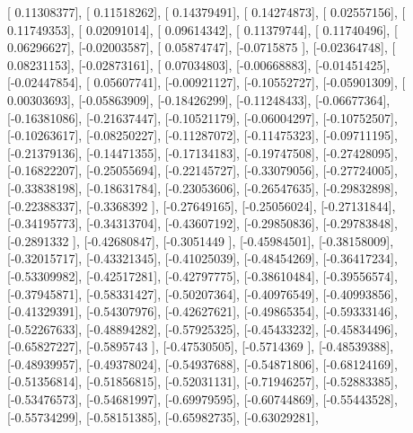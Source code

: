 \documentclass{article}
\begin{document}
       [ 0.11308377],
       [ 0.11518262],
       [ 0.14379491],
       [ 0.14274873],
       [ 0.02557156],
       [ 0.11749353],
       [ 0.02091014],
       [ 0.09614342],
       [ 0.11379744],
       [ 0.11740496],
       [ 0.06296627],
       [-0.02003587],
       [ 0.05874747],
       [-0.0715875 ],
       [-0.02364748],
       [ 0.08231153],
       [-0.02873161],
       [ 0.07034803],
       [-0.00668883],
       [-0.01451425],
       [-0.02447854],
       [ 0.05607741],
       [-0.00921127],
       [-0.10552727],
       [-0.05901309],
       [ 0.00303693],
       [-0.05863909],
       [-0.18426299],
       [-0.11248433],
       [-0.06677364],
       [-0.16381086],
       [-0.21637447],
       [-0.10521179],
       [-0.06004297],
       [-0.10752507],
       [-0.10263617],
       [-0.08250227],
       [-0.11287072],
       [-0.11475323],
       [-0.09711195],
       [-0.21379136],
       [-0.14471355],
       [-0.17134183],
       [-0.19747508],
       [-0.27428095],
       [-0.16822207],
       [-0.25055694],
       [-0.22145727],
       [-0.33079056],
       [-0.27724005],
       [-0.33838198],
       [-0.18631784],
       [-0.23053606],
       [-0.26547635],
       [-0.29832898],
       [-0.22388337],
       [-0.3368392 ],
       [-0.27649165],
       [-0.25056024],
       [-0.27131844],
       [-0.34195773],
       [-0.34313704],
       [-0.43607192],
       [-0.29850836],
       [-0.29783848],
       [-0.2891332 ],
       [-0.42680847],
       [-0.3051449 ],
       [-0.45984501],
       [-0.38158009],
       [-0.32015717],
       [-0.43321345],
       [-0.41025039],
       [-0.48454269],
       [-0.36417234],
       [-0.53309982],
       [-0.42517281],
       [-0.42797775],
       [-0.38610484],
       [-0.39556574],
       [-0.37945871],
       [-0.58331427],
       [-0.50207364],
       [-0.40976549],
       [-0.40993856],
       [-0.41329391],
       [-0.54307976],
       [-0.42627621],
       [-0.49865354],
       [-0.59333146],
       [-0.52267633],
       [-0.48894282],
       [-0.57925325],
       [-0.45433232],
       [-0.45834496],
       [-0.65827227],
       [-0.5895743 ],
       [-0.47530505],
       [-0.5714369 ],
       [-0.48539388],
       [-0.48939957],
       [-0.49378024],
       [-0.54937688],
       [-0.54871806],
       [-0.68124169],
       [-0.51356814],
       [-0.51856815],
       [-0.52031131],
       [-0.71946257],
       [-0.52883385],
       [-0.53476573],
       [-0.54681997],
       [-0.69979595],
       [-0.60744869],
       [-0.55443528],
       [-0.55734299],
       [-0.58151385],
       [-0.65982735],
       [-0.63029281],
\end{document}
